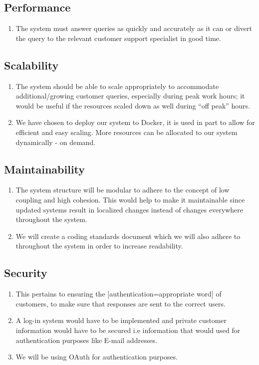 \documentclass[11pt]{article}
\begin{document}
\subsection{Performance}
\begin{enumerate}
    \item The system must answer queries as quickly and accurately as it can or divert the query to the relevant customer support specialist in good time. 
\end{enumerate}

\subsection{Scalability}
\begin{enumerate}
    \item The system should be able to scale appropriately to accommodate additional/growing customer queries, especially during peak work hours; it would be useful if the resources scaled down as well during “off peak” hours.
    \item We have chosen to deploy our system to Docker, it is used in part to allow for efficient and easy scaling. More resources can be allocated to our system dynamically - on demand.
\end{enumerate}

\subsection{Maintainability}
\begin{enumerate}
    \item The system structure will be modular to adhere to the concept of low coupling and high cohesion. This would help to make it maintainable since updated systems result in localized changes instead of changes everywhere throughout the system.
    \item We will create a coding standards document which we will also adhere to throughout the system in order to increase readability.
\end{enumerate}

\subsection{Security}
\begin{enumerate}
    \item This pertains to ensuring the [authentication=appropriate word] of customers, to make sure that responses are sent to the correct users.
    \item A log-in system would have to be implemented and private customer information would have to be secured i.e information that would used for authentication purposes like E-mail addresses.
    \item We will be using OAuth for authentication purposes.

\end{enumerate}
\end{document}
